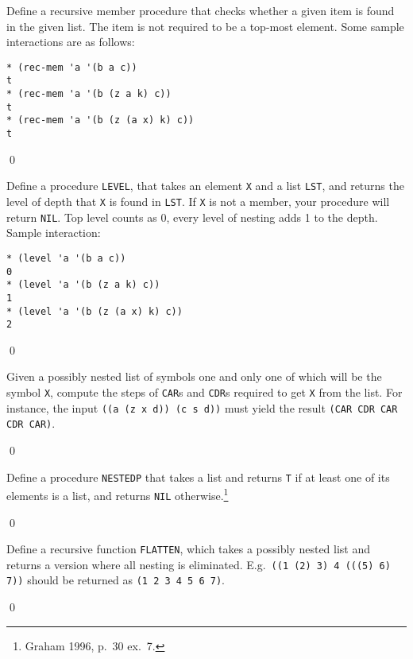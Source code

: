 \documentclass[a4paper,11pt]{article}
\begin{document}
\begin{uexercise}

Define a recursive member procedure that checks whether a given item is found in the given list. The item is not required to be a top-most element. Some sample interactions are as follows:

\begin{Verbatim}
* (rec-mem 'a '(b a c))
t
* (rec-mem 'a '(b (z a k) c))
t
* (rec-mem 'a '(b (z (a x) k) c))
t
\end{Verbatim}

\qed
\end{uexercise}

\begin{uexercise}[*]

Define a procedure \Verb+LEVEL+, that takes an element \Verb+X+ and a
list \Verb+LST+, and returns the level of depth that \Verb+X+ is found
in \Verb+LST+. If \Verb+X+ is not a member, your procedure will return
\Verb+NIL+. Top level counts as 0, every level of nesting adds 1 to
the depth. Sample interaction:

\begin{Verbatim}
* (level 'a '(b a c))
0
* (level 'a '(b (z a k) c))
1
* (level 'a '(b (z (a x) k) c))
2
\end{Verbatim}

\qed
\end{uexercise}

\begin{uexercise}[*]

Given a possibly nested list of symbols one and only one of which will
be the symbol \Verb+X+, compute the steps of \Verb+CAR+s and
\Verb+CDR+s required to get \Verb+X+ from the list.  For instance, the
input \Verb+((a (z x d)) (c s d))+ must yield the result \Verb+(CAR CDR CAR CDR CAR)+.  

\qed
\end{uexercise}

\begin{uexercise}
Define a procedure \Verb+NESTEDP+ that takes a list and returns \Verb+T+ if at least one of its elements is a list, and returns \Verb+NIL+ otherwise.\footnote{Graham 1996, p.\ 30 ex.\ 7.}

\qed
\end{uexercise}

\begin{uexercise}

Define a recursive function \Verb+FLATTEN+, which takes a possibly nested list and returns a version where all nesting is eliminated. E.g.\ \Verb+((1 (2) 3) 4 (((5) 6) 7))+ should be returned as \Verb+(1 2 3 4 5 6 7)+. 

\qed
\end{uexercise}
\end{document}
